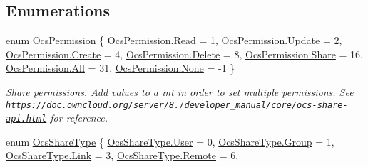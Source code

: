 \subsection*{Enumerations}
\begin{DoxyCompactItemize}
\item 
enum \hyperlink{namespaceowncloudsharp_a86ba7b86b85c7f5be2304a1ef7ae3157}{Ocs\+Permission} \{ \newline
\hyperlink{namespaceowncloudsharp_a86ba7b86b85c7f5be2304a1ef7ae3157a7a1a5f3e79fdc91edf2f5ead9d66abb4}{Ocs\+Permission.\+Read} = 1, 
\hyperlink{namespaceowncloudsharp_a86ba7b86b85c7f5be2304a1ef7ae3157a06933067aafd48425d67bcb01bba5cb6}{Ocs\+Permission.\+Update} = 2, 
\hyperlink{namespaceowncloudsharp_a86ba7b86b85c7f5be2304a1ef7ae3157a686e697538050e4664636337cc3b834f}{Ocs\+Permission.\+Create} = 4, 
\hyperlink{namespaceowncloudsharp_a86ba7b86b85c7f5be2304a1ef7ae3157af2a6c498fb90ee345d997f888fce3b18}{Ocs\+Permission.\+Delete} = 8, 
\newline
\hyperlink{namespaceowncloudsharp_a86ba7b86b85c7f5be2304a1ef7ae3157a5a95a425f74314a96f13a2f136992178}{Ocs\+Permission.\+Share} = 16, 
\hyperlink{namespaceowncloudsharp_a86ba7b86b85c7f5be2304a1ef7ae3157ab1c94ca2fbc3e78fc30069c8d0f01680}{Ocs\+Permission.\+All} = 31, 
\hyperlink{namespaceowncloudsharp_a86ba7b86b85c7f5be2304a1ef7ae3157a6adf97f83acf6453d4a6a4b1070f3754}{Ocs\+Permission.\+None} = -\/1
 \}\begin{DoxyCompactList}\small\item\em Share permissions. Add values to a int in order to set multiple permissions. See {\ttfamily \href{https://doc.owncloud.org/server/8.2/developer_manual/core/ocs-share-api.html}{\tt https\+://doc.\+owncloud.\+org/server/8./developer\+\_\+manual/core/ocs-\/share-\/api.\+html}} for reference. \end{DoxyCompactList}
\item 
enum \hyperlink{namespaceowncloudsharp_a51141c9a2e84eaced736ab96ea4b2f0b}{Ocs\+Share\+Type} \{ \newline
\hyperlink{namespaceowncloudsharp_a51141c9a2e84eaced736ab96ea4b2f0ba8f9bfe9d1345237cb3b2b205864da075}{Ocs\+Share\+Type.\+User} = 0, 
\hyperlink{namespaceowncloudsharp_a51141c9a2e84eaced736ab96ea4b2f0ba03937134cedab9078be39a77ee3a48a0}{Ocs\+Share\+Type.\+Group} = 1, 
\hyperlink{namespaceowncloudsharp_a51141c9a2e84eaced736ab96ea4b2f0ba97e7c9a7d06eac006a28bf05467fcc8b}{Ocs\+Share\+Type.\+Link} = 3, 
\hyperlink{namespaceowncloudsharp_a51141c9a2e84eaced736ab96ea4b2f0baf8508f576cd3f742dfc268258dcdf0dd}{Ocs\+Share\+Type.\+Remote} = 6, 

\end{DoxyCompactItemize}
